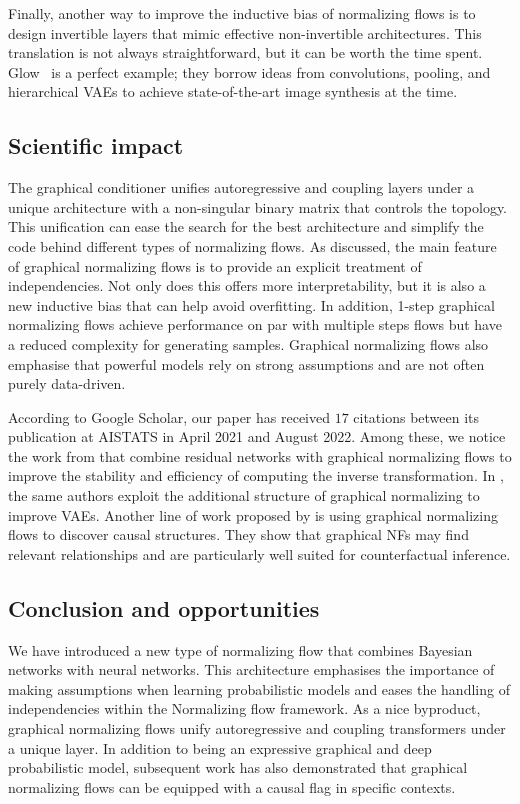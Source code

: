 Finally, another way to improve the inductive bias of normalizing flows is to design invertible layers that mimic effective non-invertible architectures. This translation is not always straightforward, but it can be worth the time spent. Glow~\citep{kingma_glow_2018} is a perfect example; they borrow ideas from convolutions, pooling, and hierarchical VAEs to achieve state-of-the-art image synthesis at the time.




\subsection{Scientific impact}
The graphical conditioner unifies autoregressive and coupling layers under a unique architecture with a non-singular binary matrix that controls the topology. This unification can ease the search for the best architecture and simplify the code behind different types of normalizing flows. As discussed, the main feature of graphical normalizing flows is to provide an explicit treatment of independencies. Not only does this offers more interpretability, but it is also a new inductive bias that can help avoid overfitting. In addition, 1-step graphical normalizing flows achieve performance on par with multiple steps flows but have a reduced complexity for generating samples. Graphical normalizing flows also emphasise that powerful models rely on strong assumptions and are not often purely data-driven.

According to Google Scholar, our paper has received $17$ citations between its publication at AISTATS in April 2021 and August 2022. Among these, we notice the work from \citet{mouton2022graphical} that combine residual networks with graphical normalizing flows to improve the stability and efficiency of computing the inverse transformation. In \citet{mouton2022siren}, the same authors exploit the additional structure of graphical normalizing to improve VAEs. Another line of work proposed by \citet{balgi2022personalized} is using graphical normalizing flows to discover causal structures. They show that graphical NFs may find relevant relationships and are particularly well suited for counterfactual inference.

\subsection{Conclusion and opportunities}
We have introduced a new type of normalizing flow that combines Bayesian networks with neural networks. This architecture emphasises the importance of making assumptions when learning probabilistic models and eases the handling of independencies within the Normalizing flow framework. As a nice byproduct, graphical normalizing flows unify autoregressive and coupling transformers under a unique layer. In addition to being an expressive graphical and deep probabilistic model, subsequent work has also demonstrated that graphical normalizing flows can be equipped with a causal flag in specific contexts.

